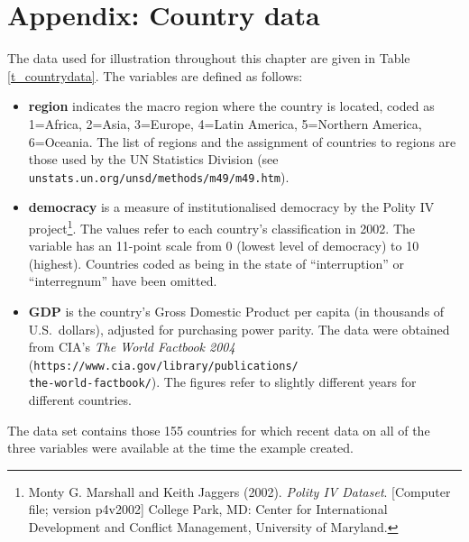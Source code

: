 \section{Appendix: Country data}
\label{s_descr1_app}

The data used for illustration throughout this chapter are given in Table
\ref{t_countrydata}. The variables are defined as follows:
\begin{itemize}
\item
\textbf{region} indicates the macro region where the country is located,
coded as 1=Africa, 2=Asia, 3=Europe, 4=Latin America, 5=Northern
America, 6=Oceania. The list of regions and the assignment of countries
to regions are those used by the UN Statistics Division
(see {\small \texttt{unstats.un.org/unsd/methods/m49/m49.htm}}).
\item
\textbf{democracy} is a measure of institutionalised democracy
by the Polity IV project\footnote{Monty G.
Marshall and Keith Jaggers (2002). \emph{Polity IV Dataset}. [Computer
file; version p4v2002] College Park, MD: Center for International
Development and Conflict Management, University of Maryland.}. The values
refer to each country's classification in 2002. The variable has an
11-point scale from 0 (lowest level of democracy) to 10 (highest).
Countries coded as being in the state of ``interruption'' or
``interregnum'' have been omitted.
\item
\textbf{GDP} is the country's Gross Domestic Product per capita
(in thousands of
U.S.\ dollars), adjusted for purchasing power parity. The data
were obtained from CIA's \emph{The World Factbook 2004}
({\small \texttt{https://www.cia.gov/library/publications/}}\\
{\small \texttt{the-world-factbook/}}).
The figures refer to slightly different years for different countries.
\end{itemize}
The data set contains those 155 countries for which recent data on
all of the three variables were available at the time the example
created.

